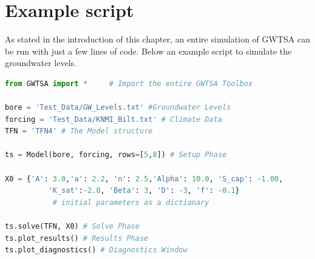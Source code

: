 \section{Example script}
As stated in the introduction of this chapter, an entire simulation of GWTSA can be run with just a few lines of code. Below an example script to simulate the groundwater levels.

\begin{lstlisting}[language=Python]
from GWTSA import * 	# Import the entire GWTSA Toolbox

bore = 'Test_Data/GW_Levels.txt' #Groundwater Levels 
forcing = 'Test_Data/KNMI_Bilt.txt' # Climate Data
TFN = 'TFN4' # The Model structure

ts = Model(bore, forcing, rows=[5,8]) # Setup Phase

X0 = {'A': 3.0,'a': 2.2, 'n': 2.5,'Alpha': 10.0, 'S_cap': -1.00, 
		  'K_sat':-2.0, 'Beta': 3, 'D': -3, 'f': -0.1} 
		   # initial parameters as a dictionary

ts.solve(TFN, X0) # Solve Phase
ts.plot_results() # Results Phase
ts.plot_diagnostics() # Diagnostics Window
\end{lstlisting}
